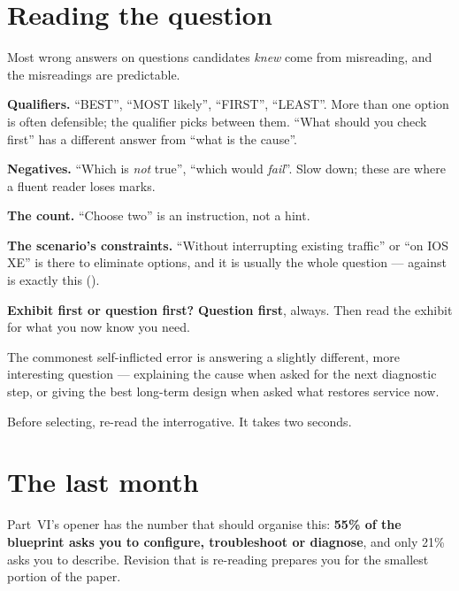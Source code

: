 \section{Reading the question}

Most wrong answers on questions candidates \emph{knew} come from misreading, and
the misreadings are predictable.

\begin{tight}
  \item \textbf{Qualifiers.} ``BEST'', ``MOST likely'', ``FIRST'', ``LEAST''. More
        than one option is often defensible; the qualifier picks between them.
        ``What should you check first'' has a different answer from ``what is the
        cause''.
  \item \textbf{Negatives.} ``Which is \emph{not} true'', ``which would
        \emph{fail}''. Slow down; these are where a fluent reader loses marks.
  \item \textbf{The count.} ``Choose two'' is an instruction, not a hint.
  \item \textbf{The scenario's constraints.} ``Without interrupting existing
        traffic'' or ``on IOS XE'' is there to eliminate options, and it is
        usually the whole question --- 
        against  is exactly this ().
  \item \textbf{Exhibit first or question first?} \textbf{Question first},
        always. Then read the exhibit for what you now know you need.
\end{tight}

\begin{alertbox}
The commonest self-inflicted error is answering a slightly different, more
interesting question --- explaining the cause when asked for the next diagnostic
step, or giving the best long-term design when asked what restores service now.

Before selecting, re-read the interrogative. It takes two seconds.
\end{alertbox}

\section{The last month}

Part~VI's opener has the number that should organise this: \textbf{55\% of the
blueprint asks you to configure, troubleshoot or diagnose}, and only 21\% asks
you to describe. Revision that is re-reading prepares you for the smallest
portion of the paper.

